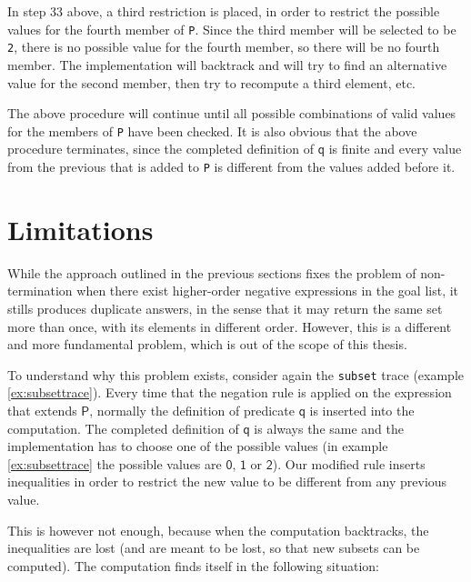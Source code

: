 \documentclass[inscr,ack,preface]{dithesis}
\theoremstyle{definition}
\newcommand{\msf}[1]{$\mathsf{#1}$}
\begin{document}
In step 33 above, a third restriction is placed, in order to restrict the possible values for the fourth member of \texttt{P}. Since the third member will be selected to be \texttt{2}, there is no possible value for the fourth member, so there will be no fourth member. The implementation will backtrack and will try to find an alternative value for the second member, then try to recompute a third element, etc.

The above procedure will continue until all possible combinations of valid values for the members of \texttt{P} have been checked. It is also obvious that the above procedure terminates, since the completed definition of \msf{q} is finite and every value from the previous that is added to \texttt{P} is different from the values added before it.

\section{Limitations}
\label{section:limitations}
While the approach outlined in the previous sections fixes the problem of non-termination when there exist higher-order negative expressions in the goal list, it stills produces duplicate answers, in the sense that it may return the same set more than once, with its elements in different order. However, this is a different and more fundamental problem, which is out of the scope of this thesis.

To understand why this problem exists, consider again the \texttt{subset} trace (example \ref{ex:subsettrace}). Every time that the negation rule is applied on the expression that extends \msf{P}, normally the definition of predicate \msf{q} is inserted into the computation. The completed definition of \msf{q} is always the same and the implementation has to choose one of the possible values (in example \ref{ex:subsettrace} the possible values are \msf{0}, \msf{1} or \msf{2}). Our modified rule inserts inequalities in order to restrict the new value to be different from any previous value.

This is however not enough, because when the computation backtracks, the inequalities are lost (and are meant to be lost, so that new subsets can be computed). The computation finds itself in the following situation:
\end{document}
